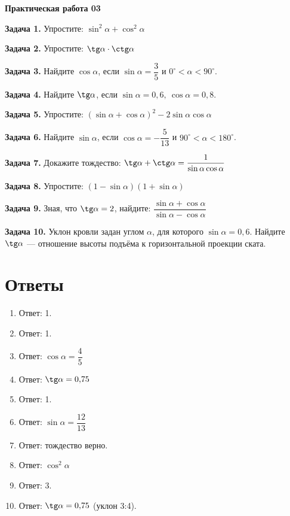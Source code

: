 \documentclass{umk-matematika}
\begin{document}
\begin{center}
{\Large\bfseries Практическая работа 03}
\end{center}
\vspace{0.5cm}

\textbf{Задача 1.} Упростите: $\sin^2 \alpha + \cos^2 \alpha$\par\vspace{10pt}
\textbf{Задача 2.} Упростите: $\tg \alpha \cdot \ctg \alpha$\par\vspace{10pt}
\textbf{Задача 3.} Найдите $\cos \alpha$, если $\sin \alpha = \dfrac{3}{5}$ и $0^\circ < \alpha < 90^\circ$.\par\vspace{10pt}
\textbf{Задача 4.} Найдите $\tg \alpha$, если $\sin \alpha = 0{,}6,\ \cos \alpha = 0{,}8$.\par\vspace{10pt}
\textbf{Задача 5.} Упростите: $(\sin \alpha + \cos \alpha)^2 - 2\sin \alpha \cos \alpha$\par\vspace{10pt}
\textbf{Задача 6.} Найдите $\sin \alpha$, если $\cos \alpha = -\dfrac{5}{13}$ и $90^\circ < \alpha < 180^\circ$.\par\vspace{10pt}
\textbf{Задача 7.} Докажите тождество: $\tg \alpha + \ctg \alpha = \dfrac{1}{\sin \alpha \cos \alpha}$\par\vspace{10pt}
\textbf{Задача 8.} Упростите: $(1 - \sin \alpha)(1 + \sin \alpha)$\par\vspace{10pt}
\textbf{Задача 9.} Зная, что $\tg \alpha = 2$, найдите: $\dfrac{\sin \alpha + \cos \alpha}{\sin \alpha - \cos \alpha}$\par\vspace{10pt}
\textbf{Задача 10.} Уклон кровли задан углом $\alpha$, для которого $\sin \alpha = 0{,}6$. Найдите $\tg \alpha$ — отношение высоты подъёма к горизонтальной проекции ската.\par\vspace{10pt}
\newpage
\section*{Ответы}

\begin{enumerate}
  \item Ответ: 1.
  \item Ответ: 1.
  \item Ответ: $\cos \alpha = \dfrac{4}{5}$
  \item Ответ: $\tg \alpha = 0{,}75$
  \item Ответ: 1.
  \item Ответ: $\sin \alpha = \dfrac{12}{13}$
  \item Ответ: тождество верно.
  \item Ответ: $\cos^2 \alpha$
  \item Ответ: 3.
  \item Ответ: $\tg \alpha = 0{,}75$ (уклон 3:4).
\end{enumerate}
\end{document}
